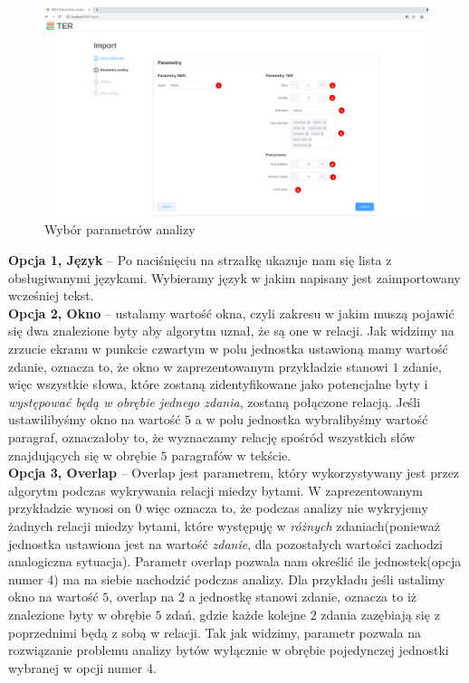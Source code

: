 \documentclass[12pt, a4paper]{article}
\begin{document}
\begin{figure}[H]
    \centering
    \includegraphics[width=\linewidth]{images/parameters.png}
    \caption{Wybór parametrów analizy}
\end{figure}

\noindent\textbf{Opcja 1, Język} -- Po naciśnięciu na strzałkę ukazuje nam się lista z  obsługiwanymi językami. Wybieramy język w jakim napisany jest zaimportowany wcześniej tekst.\\

\noindent\textbf{Opcja 2, Okno} -- ustalamy wartość okna, czyli zakresu w jakim muszą pojawić się dwa znalezione byty aby algorytm uznał, że są one w relacji. Jak widzimy na zrzucie ekranu w punkcie czwartym w polu jednostka ustawioną mamy wartość zdanie, oznacza to, że okno w zaprezentowanym przykładzie stanowi $1$ zdanie, więc wszystkie słowa, które zostaną zidentyfikowane jako potencjalne byty i \textit{występować będą w obrębie jednego zdania}, zostaną połączone relacją. Jeśli ustawilibyśmy okno na wartość $5$ a w polu jednostka wybralibyśmy wartość paragraf, oznaczałoby to, że wyznaczamy relację spośród wszystkich słów znajdujących się w obrębie $5$ paragrafów w tekście.\\

\noindent\textbf{Opcja 3, Overlap} -- Overlap jest parametrem, który wykorzystywany jest przez algorytm podczas wykrywania relacji miedzy bytami. W zaprezentowanym przykładzie wynosi on $0$ więc oznacza to, że podczas analizy nie wykryjemy żadnych relacji miedzy bytami, które występuję w \textit{różnych} zdaniach(ponieważ jednostka ustawiona jest na wartość \textit{zdanie}, dla pozostałych wartości zachodzi analogiczna sytuacja). Parametr overlap pozwala nam określić ile jednostek(opcja numer 4) ma na siebie nachodzić podczas analizy. Dla przykładu jeśli ustalimy okno na wartość $5$, overlap na $2$ a jednostkę stanowi zdanie, oznacza to iż znalezione byty w obrębie $5$ zdań, gdzie każde kolejne $2$ zdania zazębiają się z poprzednimi będą z sobą w relacji. Tak jak widzimy, parametr pozwala na rozwiązanie problemu analizy bytów wyłącznie w obrębie pojedynczej jednostki wybranej w opcji numer $4$.
\end{document}
